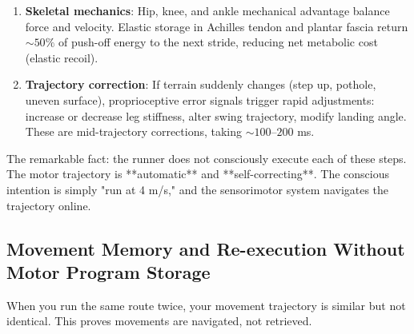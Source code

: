 \begin{example}
\begin{enumerate}[label=(\arabic*), noitemsep]
\item \textbf{Skeletal mechanics}: Hip, knee, and ankle mechanical advantage balance force and velocity. Elastic storage in Achilles tendon and plantar fascia return $\sim 50\%$ of push-off energy to the next stride, reducing net metabolic cost (elastic recoil).

\item \textbf{Trajectory correction}: If terrain suddenly changes (step up, pothole, uneven surface), proprioceptive error signals trigger rapid adjustments: increase or decrease leg stiffness, alter swing trajectory, modify landing angle. These are mid-trajectory corrections, taking $\sim 100$--$200$ ms.

\end{enumerate}

The remarkable fact: the runner does not consciously execute each of these steps. The motor trajectory is **automatic** and **self-correcting**. The conscious intention is simply "run at 4 m/s," and the sensorimotor system navigates the trajectory online.
\end{example}

\subsection{Movement Memory and Re-execution Without Motor Program Storage}
\label{subsec:movement-memory}

When you run the same route twice, your movement trajectory is similar but not identical. This proves movements are navigated, not retrieved.

